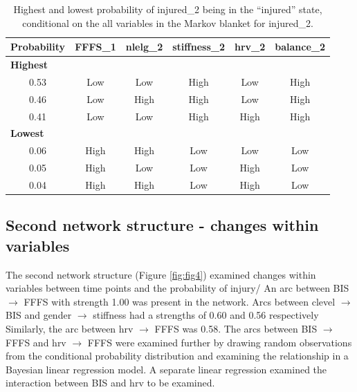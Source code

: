 \documentclass[
  english,
  man]{apa6}
\begin{document}
\begin{table}[H]

\caption{\label{tab:table7}Highest and lowest probability of injured\_2 being in the ``injured'' state, conditional on the all variables in the Markov blanket for injured\_2.}
\centering
\begin{tabular}[t]{c|c|c|c|c|c}
\hline
\textbf{Probability} & \textbf{FFFS\_1} & \textbf{nlelg\_2} & \textbf{stiffness\_2} & \textbf{hrv\_2} & \textbf{balance\_2}\\
\hline
\multicolumn{6}{l}{\textbf{Highest}}\\
\hline
\hspace{1em}0.53 & Low & Low & High & Low & High\\
\hline
\hspace{1em}0.46 & Low & High & High & Low & High\\
\hline
\hspace{1em}0.41 & Low & Low & High & High & High\\
\hline
\multicolumn{6}{l}{\textbf{Lowest}}\\
\hline
\hspace{1em}0.06 & High & High & Low & Low & Low\\
\hline
\hspace{1em}0.05 & High & Low & Low & High & Low\\
\hline
\hspace{1em}0.04 & High & High & Low & High & Low\\
\hline
\end{tabular}
\end{table}

\hypertarget{second-network-structure---changes-within-variables}{%
\subsection{Second network structure - changes within variables}\label{second-network-structure---changes-within-variables}}

The second network structure (Figure \ref{fig:fig4}) examined changes within variables between time points and the probability of injury/
An arc between BIS \(\rightarrow\) FFFS with strength 1.00 was present in the network.
Arcs between clevel \(\rightarrow\) BIS and gender \(\rightarrow\) stiffness had a strengths of 0.60 and 0.56 respectively
Similarly, the arc between hrv \(\rightarrow\) FFFS was 0.58.
The arcs between BIS \(\rightarrow\) FFFS and hrv \(\rightarrow\) FFFS were examined further by drawing random observations from the conditional probability distribution and examining the relationship in a Bayesian linear regression model.
A separate linear regression examined the interaction between BIS and hrv to be examined.
\end{document}
